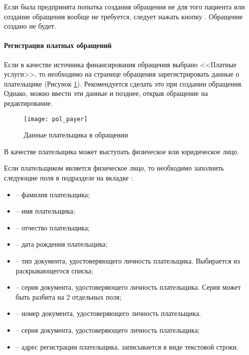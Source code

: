 {Если была предпринята попытка создания обращения не для того пациента или создание обращения вообще не требуется, следует нажать кнопку . Обращение создано не будет.

\paragraph{Регистрация платных обращений}

Если в качестве источника финансирования обращения выбрано <<Платные услуги>>, то необходимо на странице обращения зарегистрировать данные о плательщике (Рисунок \ref{img_pol_payer}). Рекомендуется сделать это при создании обращения. Однако, можно ввести эти данные и позднее, открыв обращение на редактирование. 

\begin{figure}[ht]\centering
	\texttt{[image: pol\_payer]}
	\caption{Данные плательщика в обращении}
	\label{img_pol_payer}
\end{figure}

В качестве плательщика может выступать физическое или юридическое лицо.

Если плательщиком является физическое лицо, то необходимо заполнить следующие поля в подразделе  на вкладке :
\begin{itemize}
	\item {} -- фамилия плательщика;
	\item {} -- имя плательщика;
	\item {} -- отчество плательщика;
	\item {} -- дата рождения плательщика;
	\item {} -- тип документа, удостоверяющего личность плательщика. Выбирается из раскрывающегося списка;
	\item {} -- серия документа, удостоверяющего личность плательщика. Серия может быть разбита на 2 отдельных поля;
	\item {} -- номер документа, удостоверяющего личность плательщика. 
	\item {} -- серия документа, удостоверяющего личность плательщика;
	\item {} -- адрес регистрации плательщика, записывается в виде текстовой строки. 
\end{itemize}

}
